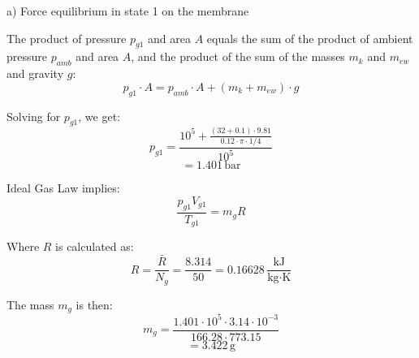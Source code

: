 a) Force equilibrium in state 1 on the membrane

The product of pressure \( p_{g1} \) and area \( A \) equals the sum of the product of ambient pressure \( p_{amb} \) and area \( A \), and the product of the sum of the masses \( m_k \) and \( m_{ew} \) and gravity \( g \):
\[ p_{g1} \cdot A = p_{amb} \cdot A + (m_k + m_{ew}) \cdot g \]

Solving for \( p_{g1} \), we get:
\[ p_{g1} = \frac{10^5 + \frac{(32 + 0.1) \cdot 9.81}{0.12 \cdot \pi \cdot 1/4}}{10^5} \]
\[ = 1.401 \, \text{bar} \]

Ideal Gas Law implies:
\[ \frac{p_{g1} V_{g1}}{T_{g1}} = m_g R \]

Where \( R \) is calculated as:
\[ R = \frac{\bar{R}}{N_g} = \frac{8.314}{50} = 0.16628 \, \frac{\text{kJ}}{\text{kg} \cdot \text{K}} \]

The mass \( m_g \) is then:
\[ m_g = \frac{1.401 \cdot 10^5 \cdot 3.14 \cdot 10^{-3}}{166.28 \cdot 773.15} \]
\[ = 3.422 \, \text{g} \]